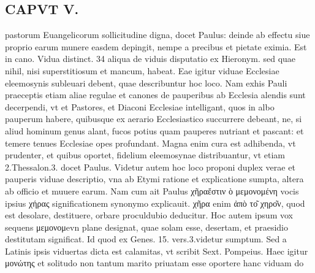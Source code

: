 \documentclass{article}
\begin{document}
\begin{pages}
\section*{CAPVT  V. }
\marginpar{[ p.257 ]}\pstart pastorum Euangelicorum sollicitudine digna, docet Paulus: deinde ab effectu siue proprio earum munere easdem depingit, nempe a precibus et pietate eximia. Est in cano. Vidua distinct. 34 aliqua de viduis disputatio ex Hieronym. sed quae nihil, nisi superstitiosum et mancum, habeat. Eae igitur viduae Ecclesiae eleemosynis subleuari debent, quae describuntur hoc loco. Nam exhis Pauli praeceptis etiam aliae regulae et canones de pauperibus ab Ecclesia alendis sunt decerpendi, vt et Pastores, et Diaconi Ecclesiae intelligant, quos in albo pauperum habere, quibusque ex aerario Ecclesiastico succurrere debeant, ne, si aliud hominum genus alant, fucos potius quam pauperes nutriant et pascant: et temere tenues Ecclesiae opes profundant. Magna enim cura est adhibenda, vt prudenter, et quibus oportet, fidelium eleemosynae distribuantur, vt etiam 2.Thessalon.3. docet Paulus. Videtur autem hoc loco proponi duplex verae et pauperis viduae descriptio, vna ab Etymi ratione et explicatione sumpta, altera ab officio et muuere earum. Nam cum ait Paulus χῆραἔστιν ὸ μεμονομένη vocis ipsius χήρας significationem synonymo explicauit. χῆρα enim ἀπὸ το͂ χηρο͂ν, quod est desolare, destituere, orbare proculdubio deducitur. Hoc autem ipsum vox sequens μεμονομevn plane designat, quae solam esse, desertam, et praesidio destitutam significat. Id quod ex Genes. 15. vers.3.videtur sumptum. Sed a Latinis ipsis viduertas dicta est calamitas, vt scribit Sext. Pompeius. Haec igitur μονώτης et solitudo non tantum marito priuatam esse oportere hanc viduam do\pend

\end{pages}
\end{document}
